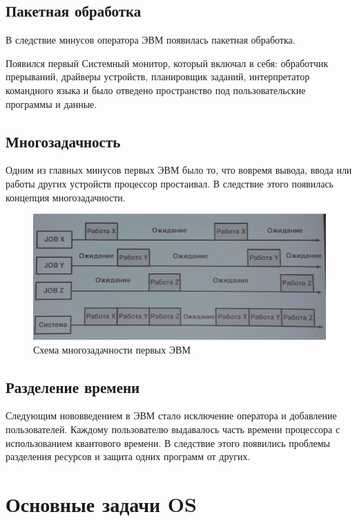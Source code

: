 \documentclass[bachelor, och, book]{SCWorks}
\theoremstyle{remark}
\begin{document}
    \subsection{Пакетная обработка}
    В следствие минусов оператора ЭВМ появилась пакетная обработка.

    Появился первый Системный монитор, который включал в себя: обработчик прерываний, драйверы устройств, планировщик заданий, интерпретатор командного языка и было отведено пространство под пользовательские программы и данные.


    \subsection{Многозадачность}

    Одним из главных минусов первых ЭВМ было то, что вовремя вывода, ввода или работы других устройств процессор простаивал. В следствие этого появилась концепция многозадачности.

    \begin{figure}[H]
        \begin{center}
            \includegraphics[scale=0.4]{res/multitasking.png}
            \caption{Схема многозадачности первых ЭВМ}
        \end{center}
    \end{figure}
    
    \subsection{Разделение времени}
    
    Следующим нововведением в ЭВМ стало исключение оператора и добавление пользователей. Каждому пользователю выдавалось часть времени процессора с использованием квантового времени. В следствие этого появились проблемы разделения ресурсов и защита одних программ от других.

    \section{Основные задачи OS}
\end{document}
